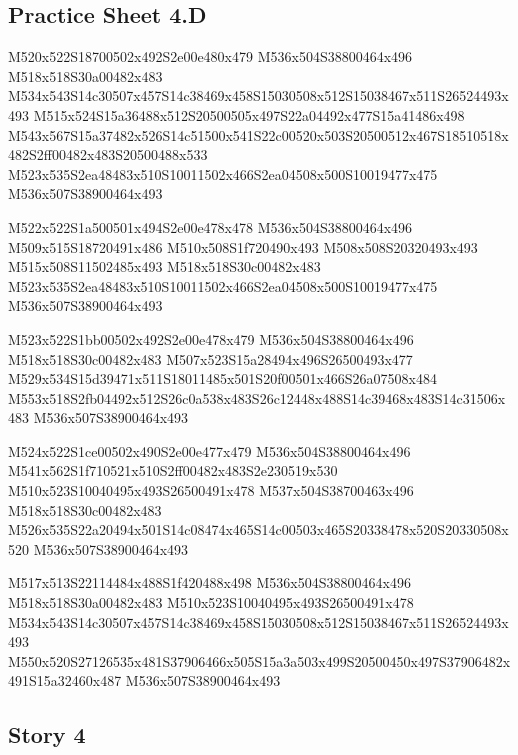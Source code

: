 \documentclass{article}
\begin{document}
\subsection{Practice Sheet 4.D}

\begin{multicols}{5}
\begin{center}
M520x522S18700502x492S2e00e480x479 %
M536x504S38800464x496 %
M518x518S30a00482x483 %
M534x543S14c30507x457S14c38469x458S15030508x512S15038467x511S26524493x493 %
M515x524S15a36488x512S20500505x497S22a04492x477S15a41486x498 %
M543x567S15a37482x526S14c51500x541S22c00520x503S20500512x467S18510518x482S2ff00482x483S20500488x533 %
M523x535S2ea48483x510S10011502x466S2ea04508x500S10019477x475 %
M536x507S38900464x493 %
\vfil
\columnbreak

M522x522S1a500501x494S2e00e478x478 %
M536x504S38800464x496 %
M509x515S18720491x486 %
M510x508S1f720490x493 %
M508x508S20320493x493 %
M515x508S11502485x493 %
M518x518S30c00482x483 %
M523x535S2ea48483x510S10011502x466S2ea04508x500S10019477x475 %
M536x507S38900464x493 %
\vfil
\columnbreak

M523x522S1bb00502x492S2e00e478x479 %
M536x504S38800464x496 %
M518x518S30c00482x483 %
M507x523S15a28494x496S26500493x477 %
M529x534S15d39471x511S18011485x501S20f00501x466S26a07508x484 %
M553x518S2fb04492x512S26c0a538x483S26c12448x488S14c39468x483S14c31506x483 %
M536x507S38900464x493 %
\vfil
\columnbreak

M524x522S1ce00502x490S2e00e477x479 %
M536x504S38800464x496 %
M541x562S1f710521x510S2ff00482x483S2e230519x530 %
M510x523S10040495x493S26500491x478 %
M537x504S38700463x496 %
M518x518S30c00482x483 %
M526x535S22a20494x501S14c08474x465S14c00503x465S20338478x520S20330508x520 %
M536x507S38900464x493 %
\vfil
\columnbreak

M517x513S22114484x488S1f420488x498 %
M536x504S38800464x496 %
M518x518S30a00482x483 %
M510x523S10040495x493S26500491x478 %
M534x543S14c30507x457S14c38469x458S15030508x512S15038467x511S26524493x493 %
M550x520S27126535x481S37906466x505S15a3a503x499S20500450x497S37906482x491S15a32460x487 %
M536x507S38900464x493 %
\vfil

\end{center}
\end{multicols}

\subsection{Story 4}
\end{document}
